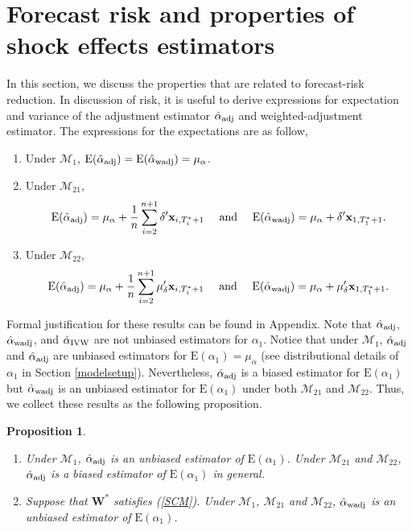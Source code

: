 \documentclass[11pt]{article}
\def\mbf#1{\mathbf{#1}} %
\def\mc#1{\mathcal{#1}} %
\def\E#1{\mathrm{E}(#1)} %
\newtheorem{prop}{Proposition}
\theoremstyle{definition}
\begin{document}
\section{Forecast risk and properties of shock effects estimators}
\label{properties}

In this section, we discuss the properties that are related to forecast-risk reduction. In discussion of risk, it is useful to derive expressions for expectation and variance of the adjustment estimator $\hat{\alpha}_{\rm adj}$ and weighted-adjustment estimator.  The expressions for the expectations are as follow,

 \begin{enumerate}[label = (\roman*)]
    \item Under $\mc{M}_{1}$, $\E{\hat{\alpha}_{\rm adj}}=\E{\hat{\alpha}_{\rm wadj}} = \mu_{\alpha}$.
    \item Under $\mc{M}_{21}$, 
    \begin{align*}
      \E{\hat{\alpha}_{\rm adj}} = \mu_{\alpha} + \frac{1}{n} \sum_{i=2}^{n+1} \delta' \mbf{x}_{i, T_i^*+1} 
      \quad \text{ and } \quad 
       \E{\hat{\alpha}_{\rm wadj}} = \mu_{\alpha} + \delta'\mbf{x}_{1, T_1^*+1} .
    \end{align*}
    \item Under $\mc{M}_{22}$,
    \begin{align*}
      \E{\hat{\alpha}_{\rm adj}} = \mu_{\alpha} + \frac{1}{n} \sum_{i=2}^{n+1} \mu_{\delta}' \mbf{x}_{i, T_i^*+1}
      \quad \text{ and } \quad 
       \E{\hat{\alpha}_{\rm wadj}} = \mu_{\alpha} + \mu_{\delta}'\mbf{x}_{1, T_1^*+1} .
    \end{align*}
  \end{enumerate}
Formal justification for these results can be found in Appendix. Note that $\hat{\alpha}_{\rm adj}$, $\hat{\alpha}_{\rm wadj}$, and $\hat{\alpha}_{\rm IVW}$ are not unbiased estimators for $\alpha_1$. Notice that under $\mc{M}_{1}$, $\hat{\alpha}_{\rm adj}$ and $\hat{\alpha}_{\rm adj}$ are unbiased estimators for $\E{\alpha_1}=\mu_{\alpha}$ (see distributional details of $\alpha_1$ in Section \ref{modelsetup}). Nevertheless, $\hat{\alpha}_{\rm adj}$ is a biased estimator for $\E{\alpha_1}$ but $\hat{\alpha}_{\rm wadj}$ is an unbiased estimator for $\E{\alpha_1}$ under both $\mc{M}_{21}$ and $\mc{M}_{22}$. Thus, we collect these results  as the following proposition. 

\begin{prop}
\label{unbiased} 
\quad 
\begin{enumerate}[label = (\roman*)]
  \item Under $\mc{M}_1$, $\hat{\alpha}_{\rm adj}$ is an unbiased estimator of $\E{\alpha_1}$. Under $\mc{M}_{21}$ and $\mc{M}_{22}$, $\hat{\alpha}_{\rm adj}$ is a biased estimator of $\E{\alpha_1}$ in general.
  \item Suppose that $\mbf{W}^*$ satisfies (\ref{SCM}). Under $\mc{M}_{1}$, $\mc{M}_{21}$ and $\mc{M}_{22}$, $\hat{\alpha}_{\rm wadj}$ is an unbiased estimator of $\E{\alpha_1}$.
\end{enumerate}
\end{prop}
\end{document}

